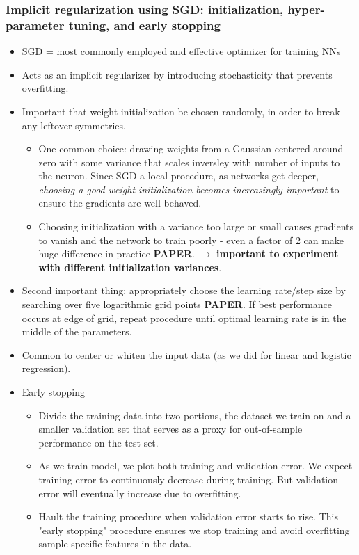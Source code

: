 \documentclass[norsk,a4paper,11pt]{article}
\begin{document}
\subsubsection{Implicit regularization using SGD: initialization, hyper-parameter tuning, and early stopping}
\begin{itemize}
	\item SGD = most commonly employed and effective optimizer for training NNs
	\item Acts as an implicit regularizer by introducing stochasticity that prevents overfitting.
	\item Important that weight initialization be chosen randomly, in order to break any leftover symmetries. 
	\begin{itemize}
		\item One common choice: drawing weights from a Gaussian centered around zero with some variance that scales inversley with number of inputs to the neuron. Since SGD a local procedure, as networks get deeper, \textit{choosing a good weight initialization becomes increasingly important} to ensure the gradients are well behaved.
		\item Choosing initialization with a variance too large or small causes gradients to vanish and the network to train poorly - even a factor of 2 can make huge difference in practice \textbf{PAPER}.  $\rightarrow$ \textbf{important to experiment with different initialization variances}. 
	\end{itemize}
	\item Second important thing: appropriately choose the learning rate/step size by searching over five logarithmic grid points \textbf{PAPER}. If best performance occurs at edge of grid, repeat procedure until optimal learning rate is in the middle of the parameters.
	\item Common to center or whiten the input data (as we did for linear and logistic regression).
	\item Early stopping
	\begin{itemize}
		\item Divide the training data into two portions, the dataset we train on and a smaller validation set that serves as a proxy for out-of-sample performance on the test set.
		\item As we train model, we plot both training and validation error. We expect training error to continuously decrease during training. But validation error will eventually increase due to overfitting. 
		\item Hault the training procedure when validation error starts to rise. This "early stopping" procedure ensures we stop training and avoid overfitting sample specific features in the data.  
	\end{itemize}
\end{itemize}
\end{document}
